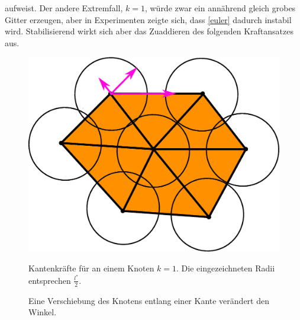     aufweist.
    Der andere Extremfall, \( k=1 \), würde zwar ein annährend gleich grobes Gitter erzeugen, aber in Experimenten zeigte sich, dass \eqref{euler}
    dadurch instabil wird. Stabilisierend wirkt sich aber das Zuaddieren des folgenden Kraftansatzes aus.
    \begin{figure}
      \begin{minipage}[t]{0.45\textwidth}
      \includegraphics[width=\textwidth]{bilder/meshCorrector/EdgeLaw.eps}
      \caption[Kantenkräfte für optimale Kantenlängen]{Kantenkräfte für an einem Knoten \( k = 1 \). Die eingezeichneten Radii entsprechen \( \frac{l^{*}}{2} \).}
      \label{edgeLaw}
      \end{minipage}
      \hfill
      \begin{minipage}[t]{0.45\textwidth}
      \caption[Winkeländerung durch Verschiebung]{Eine Verschiebung des Knotens entlang einer Kante verändert den Winkel.}
      \label{angleLaw}
      \end{minipage}
    \end{figure}

